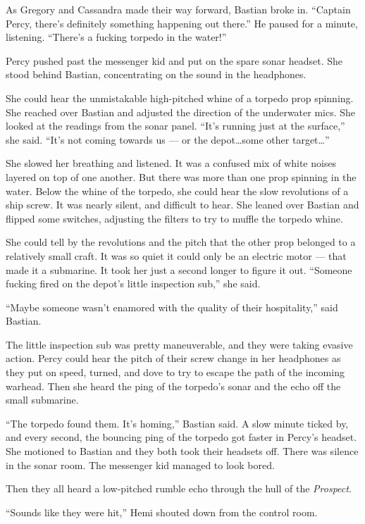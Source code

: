 \documentclass[
]{scrbook}
\begin{document}
As Gregory and Cassandra made their way forward, Bastian broke in.
``Captain Percy, there's definitely something happening out there.'' He
paused for a minute, listening. ``There's a fucking torpedo in the
water!''

Percy pushed past the messenger kid and put on the spare sonar headset.
She stood behind Bastian, concentrating on the sound in the headphones.

She could hear the unmistakable high-pitched whine of a torpedo prop
spinning. She reached over Bastian and adjusted the direction of the
underwater mics. She looked at the readings from the sonar panel. ``It's
running just at the surface,'' she said. ``It's not coming towards us
--- or the depot\ldots some other target\ldots{}''

She slowed her breathing and listened. It was a confused mix of white
noises layered on top of one another. But there was more than one prop
spinning in the water. Below the whine of the torpedo, she could hear
the slow revolutions of a ship screw. It was nearly silent, and
difficult to hear. She leaned over Bastian and flipped some switches,
adjusting the filters to try to muffle the torpedo whine.

She could tell by the revolutions and the pitch that the other prop
belonged to a relatively small craft. It was so quiet it could only be
an electric motor --- that made it a submarine. It took her just a
second longer to figure it out. ``Someone fucking fired on the depot's
little inspection sub,'' she said.

``Maybe someone wasn't enamored with the quality of their hospitality,''
said Bastian.

The little inspection sub was pretty maneuverable, and they were taking
evasive action. Percy could hear the pitch of their screw change in her
headphones as they put on speed, turned, and dove to try to escape the
path of the incoming warhead. Then she heard the ping of the torpedo's
sonar and the echo off the small submarine.

``The torpedo found them. It's homing,'' Bastian said. A slow minute
ticked by, and every second, the bouncing ping of the torpedo got faster
in Percy's headset. She motioned to Bastian and they both took their
headsets off. There was silence in the sonar room. The messenger kid
managed to look bored.

Then they all heard a low-pitched rumble echo through the hull of the
\emph{Prospect}.

``Sounds like they were hit,'' Hemi shouted down from the control room.
\end{document}
